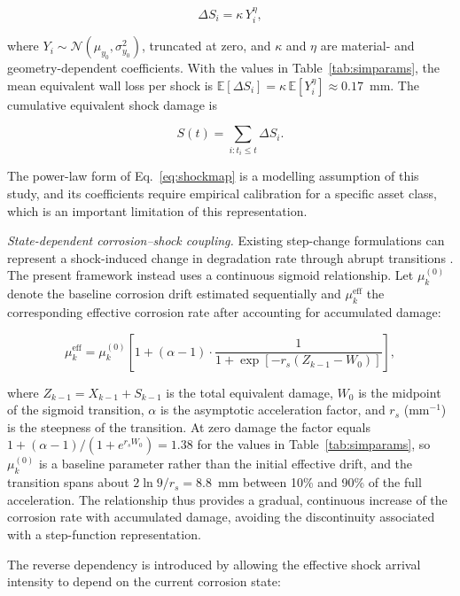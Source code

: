 \documentclass[journal]{IEEEtran}
\begin{document}
\begin{equation}
\Delta S_i = \kappa\,Y_i^{\eta},
\label{eq:shockmap}
\end{equation}

where $Y_i\sim\mathcal{N}(\mu_{y_0},\sigma_{y_0}^2)$, truncated at zero,
and $\kappa$ and $\eta$ are material- and geometry-dependent
coefficients. With the values in Table~\ref{tab:simparams}, the mean
equivalent wall loss per shock is
$\mathbb{E}[\Delta S_i]=\kappa\,\mathbb{E}[Y_i^{\eta}]\approx0.17$~mm.
The cumulative equivalent shock damage is

\[
S(t)=\sum_{i:t_i\le t}\Delta S_i .
\]

The power-law form of Eq.~\eqref{eq:shockmap} is a modelling
assumption of this study, and
its coefficients require empirical calibration for a specific asset
class, which is an important limitation of this representation.



\textit{State-dependent corrosion--shock coupling.}
Existing step-change formulations can represent a shock-induced change
in degradation rate through abrupt transitions
\cite{rafiee2014,sun2021}. The present framework instead uses a
continuous sigmoid relationship. Let $\mu_k^{(0)}$ denote the baseline
corrosion drift estimated sequentially and
$\mu_k^{\mathrm{eff}}$ the corresponding effective corrosion rate
after accounting for accumulated damage:

\begin{equation}
\mu^{\mathrm{eff}}_k =
\mu^{(0)}_k
\left[
1+(\alpha-1)
\cdot
\frac{1}{
1+\exp[-r_s(Z_{k-1}-W_0)]
}
\right],
\label{eq:mueff}
\end{equation}

where $Z_{k-1}=X_{k-1}+S_{k-1}$ is the total equivalent damage,
$W_0$ is the midpoint of the sigmoid transition, $\alpha$ is the
asymptotic acceleration factor, and $r_s$ (mm$^{-1}$) is the steepness
of the transition. At zero damage the factor equals
$1+(\alpha-1)/(1+e^{r_sW_0})=1.38$ for the values in
Table~\ref{tab:simparams}, so $\mu_k^{(0)}$ is a baseline parameter
rather than the initial effective drift, and the transition spans
about $2\ln 9/r_s=8.8$~mm between 10\% and 90\% of the full
acceleration. The relationship thus provides a gradual, continuous
increase of the corrosion rate with accumulated damage, avoiding the
discontinuity associated with a step-function representation.

The reverse dependency is introduced by allowing the effective shock
arrival intensity to depend on the current corrosion state:
\end{document}
